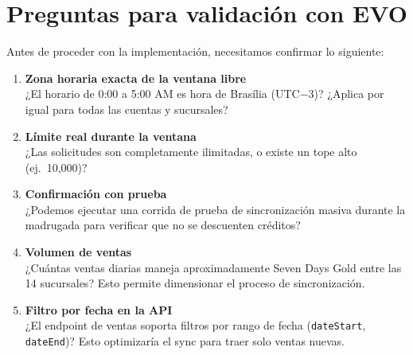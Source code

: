 \documentclass[11pt,a4paper]{article}
\begin{document}
\begin{center}
\end{center}

\section*{Preguntas para validación con EVO}

Antes de proceder con la implementación, necesitamos confirmar lo siguiente:

\begin{enumerate}[leftmargin=1.5em, itemsep=1em]
  \item \textbf{Zona horaria exacta de la ventana libre}\\
  ¿El horario de 0:00 a 5:00 AM es hora de Brasília (UTC$-$3)? ¿Aplica por igual para todas las cuentas y sucursales?
  
  \item \textbf{Límite real durante la ventana}\\
  ¿Las solicitudes son completamente ilimitadas, o existe un tope alto (ej.\ 10,000)?
  
  \item \textbf{Confirmación con prueba}\\
  ¿Podemos ejecutar una corrida de prueba de sincronización masiva durante la madrugada para verificar que no se descuenten créditos?
  
  \item \textbf{Volumen de ventas}\\
  ¿Cuántas ventas diarias maneja aproximadamente Seven Days Gold entre las 14 sucursales? Esto permite dimensionar el proceso de sincronización.
  
  \item \textbf{Filtro por fecha en la API}\\
  ¿El endpoint de ventas soporta filtros por rango de fecha (\texttt{dateStart}, \texttt{dateEnd})? Esto optimizaría el sync para traer solo ventas nuevas.
\end{enumerate}
\end{document}
